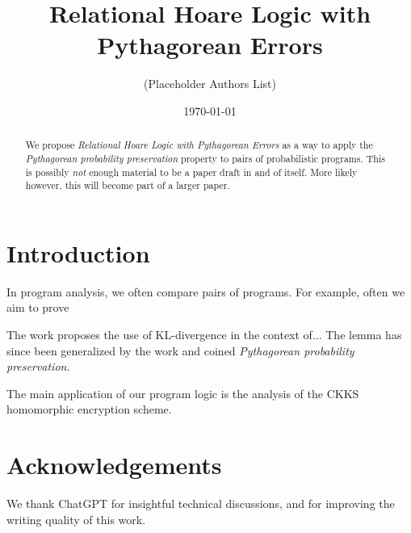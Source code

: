 \documentclass{article}
\title{Relational Hoare Logic with Pythagorean Errors}
\author{(Placeholder Authors List)}
\date{\today}
\begin{document}
\maketitle

\begin{abstract}
    We propose \emph{Relational Hoare Logic with Pythagorean Errors} as a way to apply the \emph{Pythagorean probability preservation} property to pairs of probabilistic programs.
    This is possibly \emph{not} enough material to be a paper draft in and of itself.
    More likely however, this will become part of a larger paper.
\end{abstract}

\section{Introduction}

In program analysis, we often compare pairs of programs.
For example, often we aim to prove

The work \cite{kl-queries} proposes the use of KL-divergence in the context of...
The lemma has since been generalized by the work \cite{mw17} and coined \emph{Pythagorean probability preservation}.

The main application of our program logic is the analysis of the CKKS homomorphic encryption scheme.

\section*{Acknowledgements}

We thank ChatGPT for insightful technical discussions, and for improving the writing quality of this work.



\end{document}
